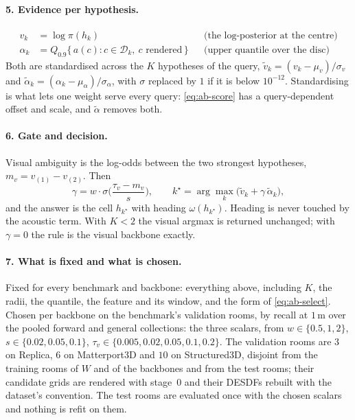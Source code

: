 \paragraph{5. Evidence per hypothesis.}
\begin{align}
  v_k &= \log \pi(h_k) & &\text{(the log-posterior at the centre)} \\
  \alpha_k &= Q_{0.9}\{\, a(c) : c \in \mathcal{D}_k,\ c \text{ rendered} \,\} & &\text{(upper quantile over the disc)}
\end{align}
Both are standardised across the $K$ hypotheses of the query,
$\tilde v_k = (v_k - \mu_v)/\sigma_v$ and $\tilde\alpha_k = (\alpha_k - \mu_\alpha)/\sigma_\alpha$,
with $\sigma$ replaced by $1$ if it is below $10^{-12}$. Standardising is what
lets one weight serve every query: \eqref{eq:ab-score} has a query-dependent
offset and scale, and $\tilde\alpha$ removes both.

\paragraph{6. Gate and decision.}
Visual ambiguity is the log-odds between the two strongest hypotheses,
$m_v = v_{(1)} - v_{(2)}$. Then
\begin{equation}
  \gamma = w \cdot \sigma\!\Big(\frac{\tau_v - m_v}{s}\Big), \qquad
  k^\star = \arg\max_k \big(\tilde v_k + \gamma\, \tilde\alpha_k\big),
  \label{eq:ab-select}
\end{equation}
and the answer is the cell $h_{k^\star}$ with heading $\omega(h_{k^\star})$.
Heading is never touched by the acoustic term. With $K < 2$ the visual
argmax is returned unchanged; with $\gamma = 0$ the rule is the visual backbone
exactly.

\paragraph{7. What is fixed and what is chosen.}
Fixed for every benchmark and backbone: everything above, including $K$, the
radii, the quantile, the feature and its window, and the form of
\eqref{eq:ab-select}. Chosen per backbone on the benchmark's validation rooms,
by recall at $1$\,m over the pooled forward and general collections: the three
scalars, from $w \in \{0.5, 1, 2\}$, $s \in \{0.02, 0.05, 0.1\}$,
$\tau_v \in \{0.005, 0.02, 0.05, 0.1, 0.2\}$. The validation rooms are
$3$ on Replica, $6$ on Matterport3D and $10$ on Structured3D, disjoint from
the training rooms of $W$ and of the backbones and from the test rooms; their
candidate grids are rendered with stage~0 and their DESDFs rebuilt with the
dataset's convention. The test rooms are evaluated once with the chosen
scalars and nothing is refit on them.

